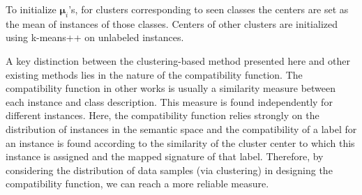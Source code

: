 \documentclass[10pt,twocolumn,letterpaper]{article}
\begin{document}
To initialize $\boldsymbol{\mu}_i$'s, for clusters corresponding to seen classes the centers are set as the mean of instances of those classes. Centers of other
clusters are initialized using k-means++ \cite{kmeanspp} on unlabeled instances.




A key distinction between the clustering-based method presented here and other existing methods lies in the nature of the compatibility function.
 The compatibility function in other works is usually a similarity measure between each instance and class description. This measure is found independently for different instances.
 Here, the compatibility function relies strongly on the distribution of instances in the semantic space and the compatibility of a label for an instance is found
according to the similarity of the cluster center to which this instance is assigned and the mapped signature of that label.
Therefore, by considering the distribution of data samples (via clustering)
in designing the compatibility function, we can reach a more reliable measure.
\end{document}
